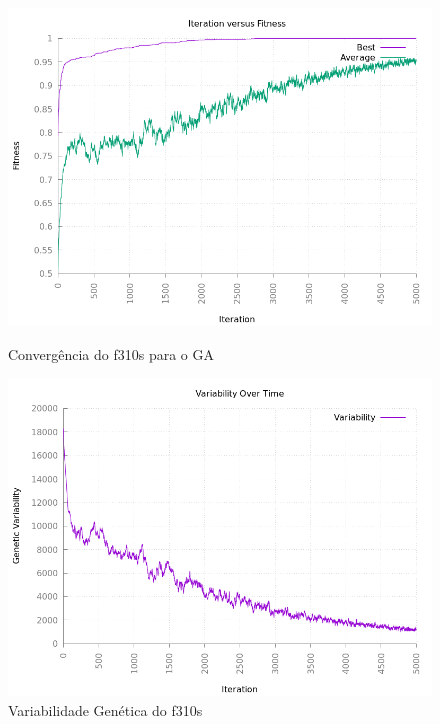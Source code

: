 \documentclass[12pt]{article}
\begin{document}
\begin{figure}[h!]
    \centering
    \begin{minipage}{0.45\textwidth}
        \centering
        \includegraphics[width=\textwidth]{pictures/f310sconvergence}
        \caption{Convergência do f310s para o GA}
    \end{minipage}
    \begin{minipage}{0.45\textwidth}
        \centering
        \includegraphics[width=\textwidth]{pictures/f310svariability}
        \caption{Variabilidade Genética do f310s}
    \end{minipage}
\end{figure}
\end{document}
